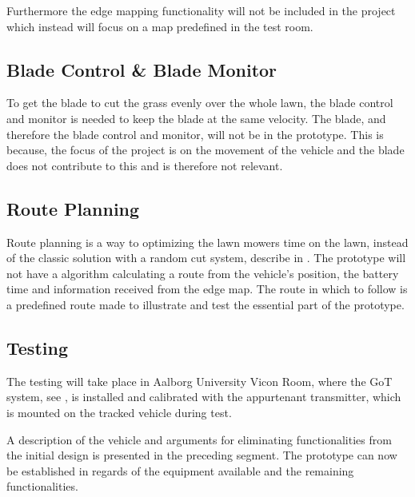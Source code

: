 Furthermore the edge mapping functionality will not be included in the project which instead will focus on a map predefined in the test room.


\subsection{Blade Control \& Blade Monitor}
To get the blade to cut the grass evenly over the whole lawn, the blade control and monitor is needed to keep the blade at the same velocity.
The blade, and therefore the blade control and monitor, will not be in the prototype. This is because, the focus of the project is on the movement of the vehicle and the blade does not contribute to this and is therefore not relevant.

\subsection{Route Planning}
Route planning is a way to optimizing the lawn mowers time on the lawn, instead of the classic solution with a random cut system, describe in . The prototype will not have a algorithm calculating a route from the vehicle's position, the battery time and information received from the edge map. The route in which to follow is a predefined route made to illustrate and test the essential part of the prototype.

\subsection{Testing}
The testing will take place in Aalborg University Vicon Room, where the GoT system, see , is installed and calibrated with the appurtenant transmitter, which is mounted on the tracked vehicle during test.

A description of the vehicle and arguments for eliminating functionalities from the initial design is presented in the preceding segment. The prototype can now be established in regards of the equipment available and the remaining functionalities.
